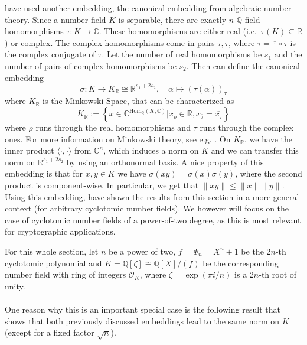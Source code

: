 \documentclass{report}
\newcommand{\R}{\mathbb{R}}
\begin{document}
\cite{LyuPeiReg} have used another embedding, the canonical embedding from algebraic number theory. Since a number field $K$ is separable, there are exactly $n$ $\mathbb{Q}$-field homomorphisms $\tau: K \to \mathbb{C}$. These homomorphisms are either real (i.e.\ $\tau(K) \subseteq \R$) or complex. The complex homomorphisms come in pairs $\tau, \overline{\tau}$, where $\overline{\tau} = \overline{\cdot} \circ \tau$ is the complex conjugate of $\tau$. Let the number of real homomorphisms be $s_1$ and the number of pairs of complex homomorphisms be $s_2$. Then can define the canonical embedding
\begin{equation}
\sigma: K \to K_{\R} \cong \R^{s_1 + 2s_2}, \quad \alpha \mapsto (\tau(\alpha))_\tau \nonumber
\end{equation}
where $K_\R$ is the Minkowski-Space, that can be characterized as
\begin{equation}
K_\R := \left\{ x \in \mathbb{C}^{\mathrm{Hom}_{\mathbb{Q}}(K, \mathbb{C})} | x_\rho \in \R, x_{\overline{\tau}} = \overline{x_\tau} \right\} \nonumber
\end{equation}
where $\rho$ runs through the real homomorphisms and $\tau$ runs through the complex ones. For more information on Minkowski theory, see e.g. \cite{Neukirch}. On $K_\R$, we have the inner product $\langle \cdot, \cdot \rangle$ from $\mathbb{C}^n$, which induces a norm on $K$ and we can transfer this norm on $\R^{s_1 + 2s_2}$ by using an orthonormal basis. A nice property of this embedding is that for $x, y \in K$ we have $\sigma(xy) = \sigma(x)\sigma(y)$, where the second product is component-wise. In particular, we get that $\| x y \| \leq \| x \| \| y \|$. Using this embedding, \cite{LyuPeiReg} have shown the results from this section in a more general context (for arbitrary cyclotomic number fields). We however will focus on the case of cyclotomic number fields of a power-of-two degree, as this is most relevant for cryptographic applications.

For this whole section, let $n$ be a power of two, $f = \Psi_n = X^n + 1$ be the $2n$-th cyclotomic polynomial and $K = \mathbb{Q}[\zeta] \cong \mathbb{Q}[X]/(f)$ be the corresponding number field with ring of integers $\mathcal{O}_K$, where $\zeta = \exp(\pi i / n)$ is a $2n$-th root of unity.
\\\\
One reason why this is an important special case is the following result that shows that both previously discussed embeddings lead to the same norm on $K$ (except for a fixed factor $\sqrt{n}$).
\end{document}
